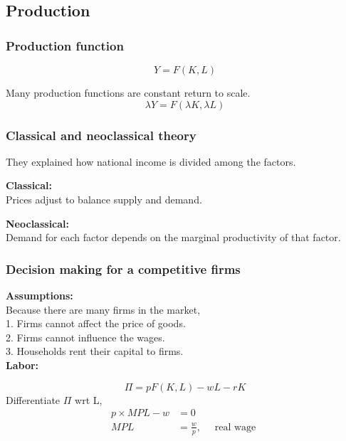 \documentclass[12pt]{article}
\begin{document}
\subsection{Production}

\subsubsection{Production function}
\begin{equation*}
Y = F(K, L)
\end{equation*}

Many production functions are constant return to scale.
\begin{equation*}
\lambda Y = F(\lambda K, \lambda L)
\end{equation*}

\subsubsection{Classical and neoclassical theory}
They explained how national income is divided among the factors.

{\textbf {Classical:}}\\
Prices adjust to balance supply and demand.

{\textbf {Neoclassical:}}\\
Demand for each factor depends on the marginal productivity of that factor.


\subsubsection{Decision making for a competitive firms}
{\textbf {Assumptions:}}\\
Because there are many firms in the market,\\
1. Firms cannot affect the price of goods.\\
2. Firms cannot influence the wages.\\
3. Households rent their capital to firms.\\


{\textbf {Labor:}}

\begin{equation*}
\Pi = pF(K,L) - wL - rK
\end{equation*}
Differentiate $ \Pi $ wrt L,
\begin{align*}
p  \times MPL  - w &= 0\\
MPL &= \frac{w}{p}, \quad \text{ real wage }
\end{align*}
\end{document}
